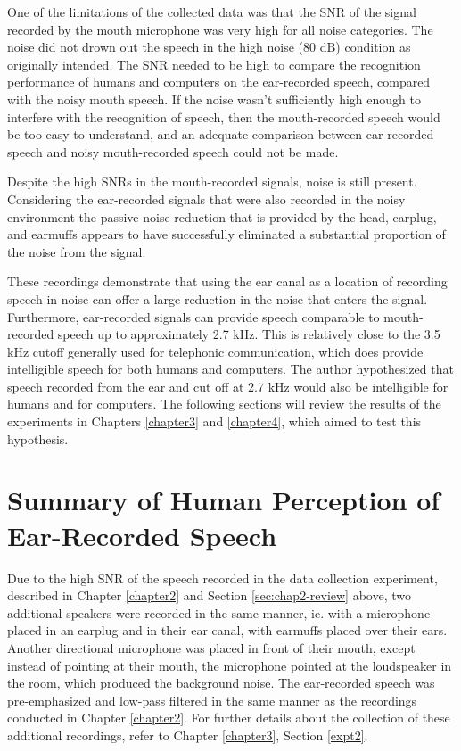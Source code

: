 One of the limitations of the collected data was that the SNR of the signal recorded by the mouth microphone was very high for all noise categories.  The noise did not drown out the speech in the high noise (80 dB) condition as originally intended.  The SNR needed to be high to compare the recognition performance of humans and computers on the ear-recorded speech, compared with the noisy mouth speech.  If the noise wasn't sufficiently high enough to interfere with the recognition of speech, then the mouth-recorded speech would be too easy to understand, and an adequate comparison between ear-recorded speech and noisy mouth-recorded speech could not be made.

Despite the high SNRs in the mouth-recorded signals, noise is still present.  Considering the ear-recorded signals that were also recorded in the noisy environment %
the passive noise reduction that is provided by the head, earplug, and earmuffs appears to have successfully eliminated a substantial proportion of the noise from the signal.

These recordings demonstrate that using the ear canal as a location of recording speech in noise can offer a large reduction in the noise that enters the signal.  Furthermore, ear-recorded signals can provide speech comparable to mouth-recorded speech up to approximately 2.7 kHz.  This is relatively close to the 3.5 kHz cutoff generally used for telephonic communication, which does provide intelligible speech for both humans and computers. The author hypothesized that speech recorded from the ear and cut off at 2.7 kHz would also be intelligible for humans and for computers.  The following sections will review the results of the experiments in Chapters \ref{chapter3} and \ref{chapter4}, which aimed to test this hypothesis.


\section{Summary of Human Perception of Ear-Recorded Speech}\label{sec:chap3-review}

Due to the high SNR of the speech recorded in the data collection experiment, described in Chapter \ref{chapter2} and Section \ref{sec:chap2-review} above, two additional speakers were recorded in the same manner, ie. with a microphone placed in an earplug and in their ear canal, with earmuffs placed over their ears.  Another directional microphone was placed in front of their mouth, except instead of pointing at their mouth, the microphone pointed at the loudspeaker in the room, which produced the background noise. The ear-recorded speech was pre-emphasized and low-pass filtered in the same manner as the recordings conducted in Chapter \ref{chapter2}. For further details about the collection of these additional recordings, refer to Chapter \ref{chapter3}, Section \ref{expt2}.

